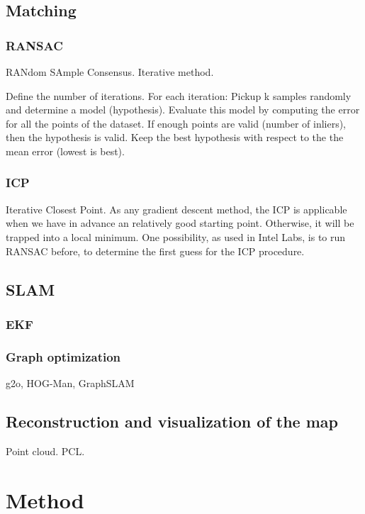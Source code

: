 \documentclass[a4paper,11pt]{kth-mag}
\begin{document}
\section{Matching}

\subsection{RANSAC}
RANdom SAmple Consensus. Iterative method.

Define the number of iterations.
For each iteration:
Pickup k samples randomly and determine a model (hypothesis). Evaluate this model by computing the error for all the points of the dataset. If enough points are valid (number of inliers), then the hypothesis is valid. Keep the best hypothesis with respect to the the mean error (lowest is best).

\subsection{ICP}
Iterative Closest Point. As any gradient descent method, the ICP is applicable when we have in advance an relatively good starting point. Otherwise, it will be trapped into a local minimum. One possibility, as used in Intel Labs, is to run RANSAC before, to determine the first guess for the ICP procedure.

\section{SLAM}

\subsection{EKF}

\subsection{Graph optimization}

g2o, HOG-Man, GraphSLAM

\section{Reconstruction and visualization of the map}

Point cloud. PCL.

\chapter{Method}
\end{document}
